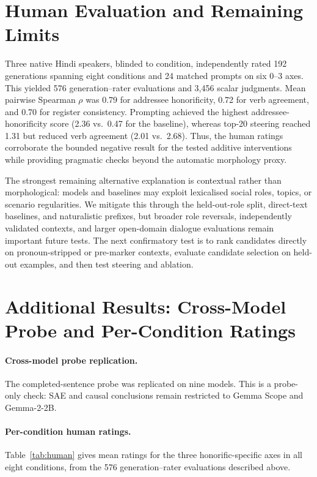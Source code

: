 \documentclass[10pt]{article}
\begin{document}
\FloatBarrier
\section{Human Evaluation and Remaining Limits}

Three native Hindi speakers, blinded to condition, independently rated 192
generations spanning eight conditions and 24 matched prompts on six 0--3 axes.
This yielded 576 generation--rater evaluations and 3,456 scalar judgments.
Mean pairwise Spearman $\rho$ was 0.79 for addressee honorificity, 0.72 for
verb agreement, and 0.70 for register consistency. Prompting achieved the
highest addressee-honorificity score (2.36 vs.\ 0.47 for the baseline), whereas
top-20 steering reached 1.31 but reduced verb agreement (2.01 vs.\ 2.68).
Thus, the human ratings corroborate the bounded negative result for the tested
additive interventions while providing pragmatic checks beyond the automatic
morphology proxy.

The strongest remaining alternative explanation is contextual rather than
morphological: models and baselines may exploit lexicalised social roles,
topics, or scenario regularities. We mitigate this through the held-out-role
split, direct-text baselines, and naturalistic prefixes, but broader role
reversals, independently validated contexts, and larger open-domain dialogue
evaluations remain important future tests. The next confirmatory test is to
rank candidates directly on pronoun-stripped or pre-marker contexts, evaluate
candidate selection on held-out examples, and then test steering and ablation.

\FloatBarrier

\section{Additional Results: Cross-Model Probe and Per-Condition Ratings}

\paragraph{Cross-model probe replication.}
The completed-sentence probe was replicated on nine models. This is a
probe-only check: SAE and causal conclusions remain restricted to Gemma Scope
and Gemma-2-2B.



\paragraph{Per-condition human ratings.}
Table~\ref{tab:human} gives mean ratings for the three honorific-specific axes
in all eight conditions, from the 576 generation--rater evaluations described
above.
\end{document}
